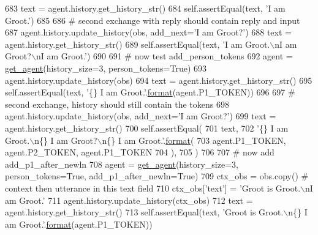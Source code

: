 \begin{DoxyCode}
683         text = agent.history.get\_history\_str()
684         self.assertEqual(text, \textcolor{stringliteral}{'I am Groot.'})
685 
686         \textcolor{comment}{# second exchange with reply should contain reply and input}
687         agent.history.update\_history(obs, add\_next=\textcolor{stringliteral}{'I am Groot?'})
688         text = agent.history.get\_history\_str()
689         self.assertEqual(text, \textcolor{stringliteral}{'I am Groot.\(\backslash\)nI am Groot?\(\backslash\)nI am Groot.'})
690 
691         \textcolor{comment}{# now test add\_person\_tokens}
692         agent = \hyperlink{namespacetests_1_1test__torch__agent_ae929d109305aaea29fbfa13ecf1f32e9}{get\_agent}(history\_size=3, person\_tokens=\textcolor{keyword}{True})
693         agent.history.update\_history(obs)
694         text = agent.history.get\_history\_str()
695         self.assertEqual(text, \textcolor{stringliteral}{'\{\} I am Groot.'}.\hyperlink{namespaceparlai_1_1chat__service_1_1services_1_1messenger_1_1shared__utils_a32e2e2022b824fbaf80c747160b52a76}{format}(agent.P1\_TOKEN))
696 
697         \textcolor{comment}{# second exchange, history should still contain the tokens}
698         agent.history.update\_history(obs, add\_next=\textcolor{stringliteral}{'I am Groot?'})
699         text = agent.history.get\_history\_str()
700         self.assertEqual(
701             text,
702             \textcolor{stringliteral}{'\{\} I am Groot.\(\backslash\)n\{\} I am Groot?\(\backslash\)n\{\} I am Groot.'}.\hyperlink{namespaceparlai_1_1chat__service_1_1services_1_1messenger_1_1shared__utils_a32e2e2022b824fbaf80c747160b52a76}{format}(
703                 agent.P1\_TOKEN, agent.P2\_TOKEN, agent.P1\_TOKEN
704             ),
705         )
706 
707         \textcolor{comment}{# now add add\_p1\_after\_newln}
708         agent = \hyperlink{namespacetests_1_1test__torch__agent_ae929d109305aaea29fbfa13ecf1f32e9}{get\_agent}(history\_size=3, person\_tokens=\textcolor{keyword}{True}, add\_p1\_after\_newln=\textcolor{keyword}{True})
709         ctx\_obs = obs.copy()  \textcolor{comment}{# context then utterance in this text field}
710         ctx\_obs[\textcolor{stringliteral}{'text'}] = \textcolor{stringliteral}{'Groot is Groot.\(\backslash\)nI am Groot.'}
711         agent.history.update\_history(ctx\_obs)
712         text = agent.history.get\_history\_str()
713         self.assertEqual(text, \textcolor{stringliteral}{'Groot is Groot.\(\backslash\)n\{\} I am Groot.'}.\hyperlink{namespaceparlai_1_1chat__service_1_1services_1_1messenger_1_1shared__utils_a32e2e2022b824fbaf80c747160b52a76}{format}(agent.P1\_TOKEN))

\end{DoxyCode}
